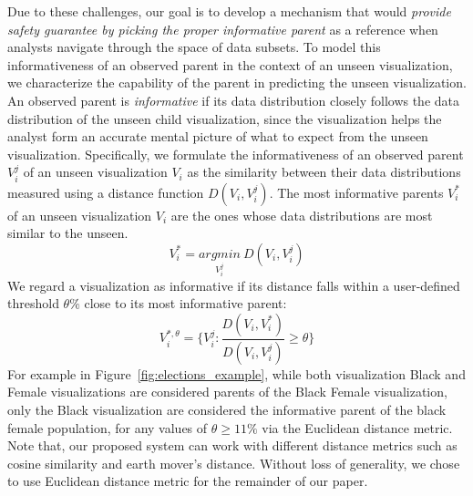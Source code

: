 Due to these challenges, our goal is to develop a mechanism that would  \emph{provide safety guarantee by picking the proper informative parent} as a reference when analysts navigate through the space of data subsets. To model this informativeness of an observed parent in the context of an unseen visualization, we characterize the capability of the parent in predicting the unseen visualization. An observed parent is \emph{informative} if its data distribution closely follows the data distribution of the unseen child visualization, since the visualization helps the analyst form an accurate mental picture of what to expect from the unseen visualization. Specifically, we formulate the informativeness of an observed parent $V_i^j$ of an unseen visualization $V_i$ as the similarity between their data distributions measured using a distance function $D(V_i, V_i^j)$. The most informative parents $V_i^*$ of an unseen visualization $V_i$ are the ones whose data distributions are most similar to the unseen.
\begin{equation}
    V_i^*=\underset{V_i^j}{argmin}\ D(V_i, V_i^j)
\end{equation}
We regard a visualization as informative if its distance falls within a user-defined threshold $\theta\%$ close to its most informative parent:
\begin{equation}
    V_i^{*, \theta} = \{V_i^j : \frac{D(V_i, V_i^*)}{D(V_i, V_i^j)} \geq \theta\}
\end{equation}
For example in Figure~\ref{fig:elections_example}, while both visualization Black and Female visualizations are considered parents of the Black Female visualization, only the Black visualization are considered the informative parent of the black female population, for any values of $\theta \geq 11\%$ via the Euclidean distance metric. Note that, our proposed system can work with different distance metrics such as cosine similarity and earth mover's distance. Without loss of generality, we chose to use Euclidean distance metric for the remainder of our paper.

